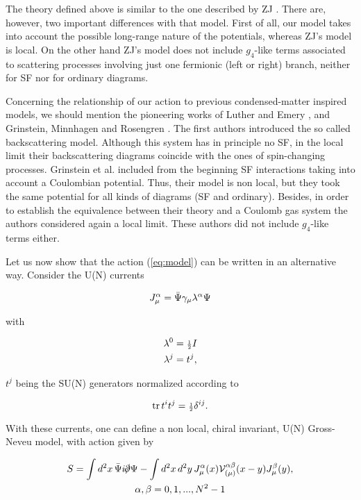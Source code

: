 \documentclass[a4paper,a4paper]{article}
\begin{document}
The theory defined above is similar to the one described by ZJ \cite{Zinn-Justin}.
There are, however, two important differences with that model. First of all, our model
takes into account the possible long-range nature of the potentials, whereas ZJ's
model is local. On the other hand ZJ's model does not include $g_4$-like terms
associated to scattering processes involving just one fermionic (left or right)
branch, neither for SF nor for ordinary diagrams.

Concerning the relationship of our action to previous condensed-matter inspired
models, we should mention the pioneering works of Luther and Emery
\cite{Luther-Emery}, and Grinstein, Minnhagen and Rosengren \cite{GMR}. The first
authors introduced the so called backscattering model. Although this system has in
principle no SF, in the local limit their backscattering diagrams coincide with the
ones of spin-changing processes. Grinstein et al. included from the beginning SF
interactions taking into account a Coulombian potential. Thus, their model is non
local, but they took the same potential for all kinds of diagrams (SF and ordinary).
Besides, in order to establish the equivalence between their theory and a Coulomb gas
system the authors considered again a local limit. These authors did not include
$g_4$-like terms either.

Let us now show that the action (\ref{eq:model}) can be written in an alternative way.
Consider the U(N) currents

\begin{equation}
J^\alpha_\mu=\bar{\Psi}\gamma_\mu\lambda^\alpha\Psi
\end{equation}

\noindent with

\begin{align}
\lambda^0&={\scriptstyle\frac{1}{2}} I \\ \lambda^j&=t^j,
\end{align}

\noindent $t^j$ being the SU(N) generators normalized according to

\begin{equation}
\operatorname{tr}{t^it^j}={\scriptstyle\frac{1}{2}}\delta^{ij}.
\end{equation}

With these currents, one can define a non local, chiral invariant, U(N) Gross-Neveu
model, with action given by

\begin{multline}\label{eq:grossneveu}
S=\int d^2x\, \PsiB i\slp \Psi - \int
d^2x\,d^2y\,J^\alpha_\mu(x)\V^{\alpha\beta}_{(\mu)}(x-y)J^\beta_\mu(y),\\
\alpha,\beta=0,1,...,N^2-1
\end{multline}
\end{document}
